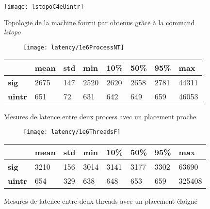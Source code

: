 \begin{figure}[H]
  \texttt{[image: lstopoC4eUintr]}
  \caption{Topologie de la machine fourni par \atos{} obtenus grâce à la command \emph{lstopo}}
  \label{fig:lstopo}
\end{figure}

\begin{figure}[H]
  \begin{subfigure}{\textwidth}
    \texttt{[image: latency/1e6ProcessNT]}
    \caption{}
    \label{subfig:latency1e6ProcessNT}
  \end{subfigure}
  \begin{subtable}{\textwidth}
    \centering
    \begin{tabular}{| l | l | l | l | l | l | l | l |}
      \hline
      &\bf mean &\bf std &\bf min  &\bf 10\% &\bf 50\% &\bf 95\% &\bf max\\
      \hline
      \bf sig   & 2675 & 147 & 2520 & 2620 & 2658 & 2781 & 44311\\
      \hline
      \bf uintr & 651  & 72  & 631  & 642  & 649  & 659  & 46053\\
      \hline
    \end{tabular}
    \caption{}
    \label{tab:latency1e6ProcessNT}
  \end{subtable}
  \caption{Mesures de latence entre deux process avec un placement proche}
  \label{fig:latency1e6ProcessNT}
\end{figure}

\begin{figure}[H]
  \begin{subfigure}{\textwidth}
    \texttt{[image: latency/1e6ThreadsF]}
    \caption{}
    \label{subfig:latency1e6ThreadsF}
  \end{subfigure}
  \begin{subtable}{\textwidth}
    \centering
    \begin{tabular}{| l | l | l | l | l | l | l | l |}
      \hline
      &\bf mean &\bf std &\bf min  &\bf 10\% &\bf 50\% &\bf 95\% &\bf max\\
      \hline
      \bf sig   & 3210 & 156 & 3014 & 3141 & 3177 & 3302 & 63690\\
      \hline
      \bf uintr & 654  & 329 & 638  & 648  & 653  & 659  & 325408\\
      \hline
    \end{tabular}
    \caption{}
    \label{tab:latency1e6ThreadsF}
  \end{subtable}
  \caption{Mesures de latence entre deux threads avec un placement éloigné}
  \label{fig:latency1e6ThreadsF}
\end{figure}

